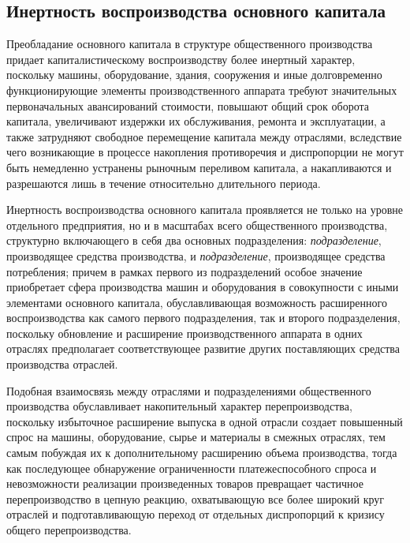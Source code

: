 \subsection{Инертность воспроизводства основного капитала}
Преобладание основного капитала в структуре общественного производства придает капиталистическому воспроизводству более инертный характер, поскольку машины, оборудование, здания, сооружения и иные долговременно функционирующие элементы производственного аппарата требуют значительных первоначальных авансирований стоимости, повышают общий срок оборота капитала, увеличивают издержки их обслуживания, ремонта и эксплуатации, а также затрудняют свободное перемещение капитала между отраслями, вследствие чего возникающие в процессе накопления противоречия и диспропорции не могут быть немедленно устранены рыночным переливом капитала, а накапливаются и разрешаются лишь в течение относительно длительного периода.

Инертность воспроизводства основного капитала проявляется не только на уровне отдельного предприятия, но и в масштабах всего общественного производства, структурно включающего в себя два основных подразделения: \textit{\uppercase\expandafter{} подразделение}, производящее средства производства, и \textit{\uppercase\expandafter{} подразделение}, производящее средства потребления; причем в рамках первого из подразделений особое значение приобретает сфера производства машин и оборудования в совокупности с иными элементами основного капитала, обуславливающая возможность расширенного воспроизводства как самого первого подразделения, так и второго подразделения, поскольку обновление и расширение производственного аппарата в одних отраслях предполагает соответствующее развитие других поставляющих средства производства отраслей.

Подобная взаимосвязь между отраслями и подразделениями общественного производства обуславливает накопительный характер перепроизводства, поскольку избыточное расширение выпуска в одной отрасли создает повышенный спрос на машины, оборудование, сырье и материалы в смежных отраслях, тем самым побуждая их к дополнительному расширению объема производства, тогда как последующее обнаружение ограниченности платежеспособного спроса и невозможности реализации произведенных товаров превращает частичное перепроизводство в цепную реакцию, охватывающую все более широкий круг отраслей и подготавливающую переход от отдельных диспропорций к кризису общего перепроизводства.

